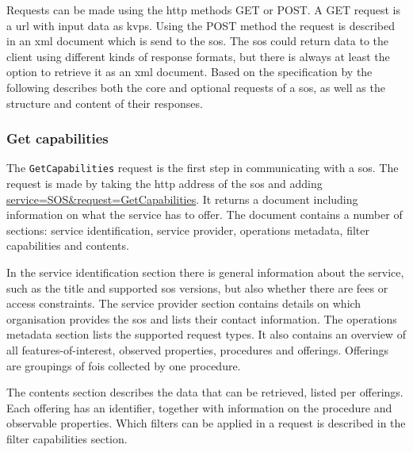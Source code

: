 Requests can be made using the \acf{http} methods GET or POST. A GET request is a \ac{url} with input data as \acfp{kvp}. Using the POST method the request is described in an \ac{xml} document which is send to the \ac{sos}. The \ac{sos} could return data to the client using different kinds of response formats, but there is always at least the option to retrieve it as an \ac{xml} document. Based on the specification by \cite{SW:OGC2} the following describes both the core and optional requests of a \ac{sos}, as well as the structure and content of their responses. 


\subsubsection{Get capabilities}
\label{par:capabilities}
The \texttt{GetCapabilities} request is the first step in communicating with a \ac{sos}. The request is made by taking the \ac{http} address of the \ac{sos} and adding \url{service=SOS\&request=GetCapabilities}. It returns a document including information on what the service has to offer. The document contains a number of sections: service identification, service provider, operations metadata, filter capabilities and contents. 

In the service identification section there is general information about the service, such as the title and supported \ac{sos} versions, but also whether there are fees or access constraints. The service provider section contains details on which organisation provides the \ac{sos} and lists their contact information. The operations metadata section lists the supported request types. It also contains an overview of all features-of-interest, observed properties, procedures and offerings. Offerings are groupings of \acp{foi} collected by one procedure.

The contents section describes the data that can be retrieved, listed per offerings. Each offering has an identifier, together with information on the procedure and observable properties. Which filters can be applied in a request is described in the filter capabilities section. 

